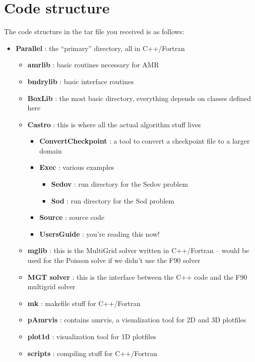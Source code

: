 \section{Code structure}
The code structure in the tar file you received is as follows:

\begin{itemize}
\item {\bf Parallel}   : the ``primary'' directory, all in C++/Fortran 
  \begin{itemize}
  \item {\bf amrlib}   : basic routines necessary for AMR 
  \item {\bf bndrylib} : basic interface routines
  \item {\bf BoxLib}   : the most basic directory, everything depends on classes defined here
  \item {\bf Castro}   : this is where all the actual algorithm stuff lives
  \begin{itemize}
    \item {\bf ConvertCheckpoint} : a tool to convert a checkpoint file to a larger domain
    \item {\bf Exec}       : various examples
    \begin{itemize}
      \item {\bf Sedov}        : run directory for the Sedov problem
      \item {\bf Sod}          : run directory for the Sod problem
    \end{itemize}
    \item {\bf Source}     : source code
    \item {\bf UsersGuide} : you're reading this now!
  \end{itemize}
  \item {\bf mglib}      : this is the MultiGrid solver written in C++/Fortran -- would be 
                           used for the Poisson solve if we didn't use the F90 solver
  \item {\bf MGT solver} : this is the interface between the C++ code and the F90 
                           multigrid solver
  \item {\bf mk}         : makefile stuff  for C++/Fortran
  \item {\bf pAmrvis}    : contains amrvis, a visualization tool for 2D and 3D plotfiles
  \item {\bf plot1d}     : visualization tool for 1D plotfiles
  \item {\bf scripts}    : compiling stuff for C++/Fortran

\end{itemize}
\end{itemize}
